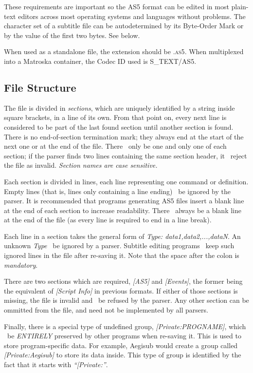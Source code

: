 \documentclass{spec}
\begin{document}
These requirements are important so the AS5 format can be edited in most plain-text editors
across most operating systems and languages without problems. The character set of a
subtitle file can be autodetermined by its Byte-Order Mark or by the value of the first
two bytes. See below.

When used as a standalone file, the extension should be \textsc{.as5}. When multiplexed
into a Matroska container, the Codec ID used is \textsc{S\_TEXT/AS5}.



\subsection{File Structure}
The file is divided in \emph{sections}, which are uniquely identified by a string inside
square brackets, in a line of its own. From that point on, every next line is considered
to be part of the last found section until another section is found. There is no end-of-section
termination mark; they always end at the start of the next one or at the end of the file.
There \must\ only be one and only one of each section; if the parser finds two lines containing
the same section header, it \must\ reject the file as invalid. \emph{Section names are case sensitive.}

Each section is divided in lines, each line representing one command or definition. Empty
lines (that is, lines only containing a line ending) \must\ be ignored by the parser.
It is recommended that programs generating AS5 files insert a blank line at the end of each
section to increase readability. There \must\ always be a blank line at the end of the file
(as every line is required to end in a line break).

Each line in a section takes the general form of \textit{Type: data1,data2,...,dataN}. An
unknown \textit{Type} \must\ be ignored by a parser. Subtitle editing programs \should\ keep
such ignored lines in the file after re-saving it. Note that the space after the colon is \emph{mandatory}.

There are two sections which are required, \emph{[AS5]} and \emph{[Events]}, the former being
the equivalent of \emph{[Script Info]} in previous formats. If either of those sections is
missing, the file is invalid and \must\ be refused by the parser. Any other section
can be ommitted from the file, and need not be implemented by all parsers.

Finally, there is a special type of undefined group, \emph{[Private:PROGNAME]}, which 
\must\ be \emph{ENTIRELY} preserved by other programs when re-saving it. This is used to
store program-specific data. For example, Aegisub would create a group called
\emph{[Private:Aegisub]} to store its data inside. This type of group is identified
by the fact that it starts with \emph{``[Private:''}.
\end{document}
